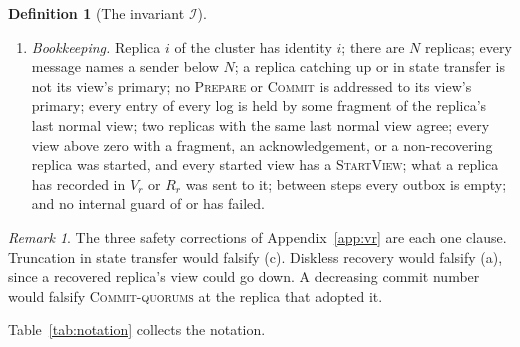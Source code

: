 \documentclass[11pt,a4paper]{article}
\theoremstyle{plain}
\theoremstyle{definition}
\newtheorem{definition}[theorem]{Definition}
\theoremstyle{remark}
\newtheorem{remark}[theorem]{Remark}
\newcommand{\msg}[1]{\textsc{#1}}
\newcommand{\Inv}{\mathcal{I}}
\newcommand{\CommitsBacked}{\textsc{Commit-quorums}}
\begin{document}
\begin{definition}[The invariant $\Inv$]
\begin{enumerate}[nosep,label=(\alph*)]
    log of the primary of its view, answers a \msg{Recovery} with its
    nonce, and, when it answers a replica now recovering, covers every
    op-number that replica acknowledged in the state's view.
  \item \emph{Bookkeeping.} Replica $i$ of the cluster has identity $i$;
    there are $N$ replicas; every message names a sender below $N$; a
    replica catching up or in state transfer is not its view's primary;
    no \msg{Prepare} or \msg{Commit} is addressed to its view's primary;
    every entry of every log is held by some fragment of the replica's
    last normal view; two replicas with the same last normal view agree;
    every view above zero with a fragment, an acknowledgement, or a
    non-recovering replica was started, and every started view has a
    \msg{StartView}; what a replica has recorded in $V_r$ or $R_r$ was
    sent to it; between steps every outbox is empty; and no internal
    guard of  or  has failed.
\end{enumerate}
\end{definition}

\begin{remark}
The three safety corrections of Appendix~\ref{app:vr} are each one
clause. Truncation in state transfer would falsify (c). Diskless
recovery would falsify (a), since a recovered replica's view could go
down. A decreasing commit number would falsify \CommitsBacked{} at the
replica that adopted it.
\end{remark}

Table~\ref{tab:notation} collects the notation.
\end{document}
